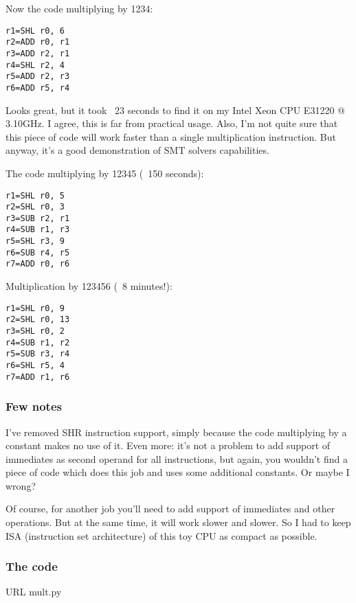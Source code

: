 Now the code multiplying by 1234:

\begin{lstlisting}
r1=SHL r0, 6
r2=ADD r0, r1
r3=ADD r2, r1
r4=SHL r2, 4
r5=ADD r2, r3
r6=ADD r5, r4
\end{lstlisting}

Looks great, but it took ~23 seconds to find it on my Intel Xeon CPU E31220 @ 3.10GHz.
I agree, this is far from practical usage.
Also, I'm not quite sure that this piece of code will work faster than a single multiplication instruction.
But anyway, it's a good demonstration of SMT solvers capabilities.

The code multiplying by 12345 (~150 seconds):

\begin{lstlisting}
r1=SHL r0, 5
r2=SHL r0, 3
r3=SUB r2, r1
r4=SUB r1, r3
r5=SHL r3, 9
r6=SUB r4, r5
r7=ADD r0, r6
\end{lstlisting}

Multiplication by 123456 (~8 minutes!):

\begin{lstlisting}
r1=SHL r0, 9
r2=SHL r0, 13
r3=SHL r0, 2
r4=SUB r1, r2
r5=SUB r3, r4
r6=SHL r5, 4
r7=ADD r1, r6
\end{lstlisting}

\subsubsection{Few notes}

I've removed SHR instruction support, simply because the code multiplying by a constant makes no use of it.
Even more: it's not a problem to add support of immediates as second operand for all instructions,
but again, you wouldn't find a piece of code which does this job and uses some additional constants.
Or maybe I wrong?

Of course, for another job you'll need to add support of immediates and other operations.
But at the same time, it will work slower and slower.
So I had to keep ISA (instruction set architecture) of this toy CPU as compact as possible.

\subsubsection{The code}

URL
mult.py

